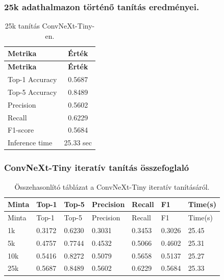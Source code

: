 \subsubsection{25k adathalmazon történő tanítás eredményei.}
  \begin{center}
    \begin{longtable}{l c}
    \caption{25k tanítás ConvNeXt-Tiny-en.} \label{tab:phase03_ConvNeXt-Tiny_25k} \\
    \toprule
    \textbf{Metrika} & \textbf{Érték} \\
    \midrule
    \endfirsthead
    \toprule
    \textbf{Metrika} & \textbf{Érték} \\
    \midrule
    \endhead
    Top-1 Accuracy & 0.5687 \\
    Top-5 Accuracy & 0.8489 \\
    Precision      & 0.5602 \\
    Recall         & 0.6229 \\
    F1-score       & 0.5684 \\
    Inference time & 25.33 sec \\
    \bottomrule
    \end{longtable}
  \end{center}

\subsubsection{ConvNeXt-Tiny iteratív tanítás összefoglaló}
  \begin{center}
    \begin{longtable}{lllllll}
    \caption{Összehasonlító táblázat a ConvNeXt-Tiny iteratív tanításáról.}\label{tab:phase3_ConvNeXt-Tiny_summary_table}\\
    \toprule
    Minta & Top-1 & Top-5 & Precision & Recall & F1 & Time(s) \\
    \midrule
    \endfirsthead
    \toprule
    Minta & Top-1 & Top-5 & Precision & Recall & F1 & Time(s) \\
    \midrule
    \endhead
    1k & 0.3172 & 0.6230 & 0.3031 & 0.3453 & 0.3026 & 25.45 \\
    5k & 0.4757 & 0.7744 & 0.4532 & 0.5066 & 0.4602 & 25.31 \\
    10k & 0.5416 & 0.8272 & 0.5079 & 0.5658 & 0.5137 & 25.27 \\
    25k & 0.5687 & 0.8489 & 0.5602 & 0.6229 & 0.5684 & 25.33 \\
    \bottomrule
    \end{longtable}
  \end{center}
  
